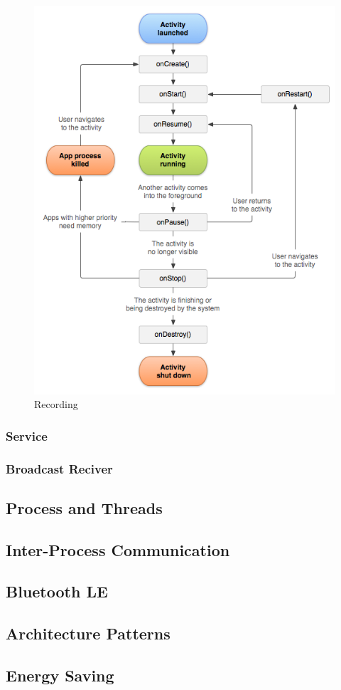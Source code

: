 \begin{figure}
    \centering
    \includegraphics[scale=0.6]{images/androidlifecycle.png}
    \caption{Recording}
    \label{fig:hta_recording}
\end{figure}

\subsubsection{Service}
\subsubsection{Broadcast Reciver}

\subsection{Process and Threads}

\subsection{Inter-Process Communication}

\subsection{Bluetooth LE}

\subsection{Architecture Patterns}


\subsection{Energy Saving}